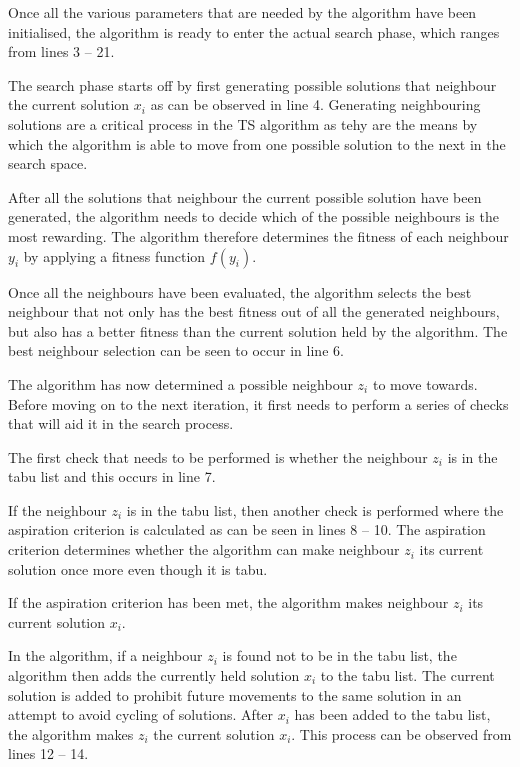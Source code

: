 Once all the various parameters that are needed by the algorithm have been initialised, the algorithm is ready to enter the actual search phase, which ranges from lines 3 -- 21. 

The search phase starts off by first generating possible solutions that neighbour the current solution $x_i$ as can be observed in line 4. Generating neighbouring solutions are a critical process in the \gls{TS} algorithm as tehy are the means by which the algorithm is able to move from one possible solution to the next in the search space.

After all the solutions that neighbour the current possible solution have been generated, the algorithm needs to decide which of the possible neighbours is the most rewarding. The algorithm therefore determines the fitness of each neighbour $y_i$ by applying a fitness function $f(y_i)$. 

Once all the neighbours have been evaluated, the algorithm selects the best neighbour that not only has the best fitness out of all the generated neighbours, but also has a better fitness than the current solution held by the algorithm. The best neighbour selection can be seen to occur in line 6.

The algorithm has now determined a possible neighbour $z_i$ to move towards. Before moving on to the next iteration, it first needs to perform a series of checks that will aid it in the search process.

The first check that needs to be performed is whether the neighbour $z_i$ is in the tabu list and this occurs in line 7. 

If the neighbour $z_i$ is in the tabu list, then another check is performed where the aspiration criterion is calculated as can be seen in lines 8 -- 10. The aspiration criterion determines whether the algorithm can make neighbour $z_i$ its current solution once more even though it is tabu. 

If the aspiration criterion has been met, the algorithm makes neighbour $z_i$ its current solution $x_i$. 

In the algorithm, if a neighbour $z_i$ is found not to be in the tabu list, the algorithm then adds the currently held solution $x_i$ to the tabu list. The current solution is added to prohibit future movements to the same solution in an attempt to avoid cycling of solutions. After $x_i$ has been added to the tabu list, the algorithm makes $z_i$ the current solution $x_i$. This process can be observed from lines 12 -- 14.

